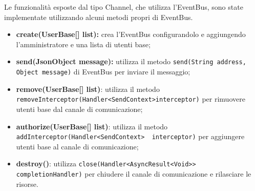         Le funzionalità esposte dal tipo Channel, che utilizza l'EventBus, sono state implementate utilizzando alcuni metodi propri di EventBus.
        \begin{itemize}
          \item\textbf{create(UserBase[] list):} crea l'EventBus configurandolo e aggiungendo l'amministratore e una lista di utenti base;
          \item\textbf{send(JsonObject message):} utilizza il metodo \verb+send(String address, Object message)+ di EventBus per inviare il messaggio;
          \item\textbf{remove(UserBase[] list)}: utilizza il metodo \verb+removeInterceptor(Handler<SendContext>+\linebreak \verb+interceptor)+ per rimuovere utenti base dal canale di comunicazione;
          \item\textbf{authorize(UserBase[] list)}: utilizza il metodo \verb+addInterceptor(Handler<SendContext> +\linebreak \verb+ interceptor)+ per aggiungere utenti base al canale di comunicazione;
          \item\textbf{destroy()}: utilizza \verb+close(Handler<AsyncResult<Void>> completionHandler)+ per chiudere il canale di comunicazione e rilasciare le risorse.
        \end{itemize}
